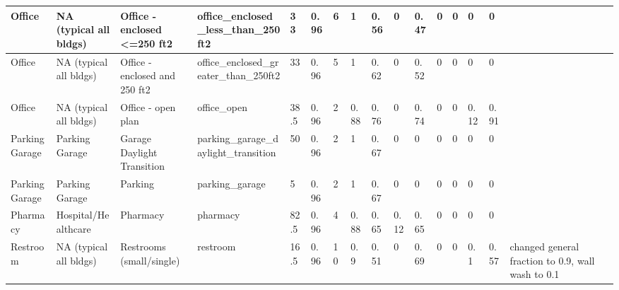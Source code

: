 \begin{center}
\begin{landscape}
\begin{longtable}{|p{0.75in}|p{0.75in}|p{0.75in}|p{0.75in}|p{0.3in}|p{0.3in}|p{0.3in}|p{0.3in}|p{0.3in}|p{0.3in}|p{0.3in}|p{0.3in}|p{0.3in}|p{0.3in}|p{0.3in}|p{0.6in}|}
      Office                                  & NA (typical all bldgs)      & Office - enclosed <=250 ft2                      & office\_enclosed\_less\_than\_250ft2                           & 33   & 0.96 & 6  & 1      & 0.56  & 0     & 0.47  & 0    & 0    & 0    & 0    &                                                                                      \\ \hline
      Office                                  & NA (typical all bldgs)      & Office - enclosed and 250 ft2                   & office\_enclosed\_greater\_than\_250ft2                         & 33   & 0.96 & 5  & 1      & 0.62  & 0     & 0.52  & 0    & 0    & 0    & 0    &                                                                                       \\ \hline
      Office                                  & NA (typical all bldgs)      & Office - open plan~                             & office\_open                                                    & 38.5 & 0.96 & 2  & 0.88   & 0.76  & 0     & 0.74  & 0    & 0    & 0.12 & 0.91 &                                                                                       \\ \hline
      Parking Garage                          & Parking Garage              & Garage Daylight Transition                      & parking\_garage\_daylight\_transition                           & 50   & 0.96 & 2  & 1      & 0.67  & 0     & 0     & 0    & 0    & 0    & 0    &                                                                                       \\ \hline
      Parking Garage                          & Parking Garage              & Parking                                         & parking\_garage                                                 & 5    & 0.96 & 2  & 1      & 0.67  & 0     & 0     & 0    & 0    & 0    & 0    &                                                                                       \\ \hline
      Pharmacy                                & Hospital/Healthcare         & Pharmacy                                        & pharmacy                                                        & 82.5 & 0.96 & 4  & 0.88   & 0.65  & 0.12  & 0.65  & 0    & 0    & 0    & 0    &                                                                                       \\ \hline
      Restroom                                & NA (typical all bldgs)      & Restrooms (small/single)                      & restroom                                                        & 16.5 & 0.96 & 10 & 0.9    & 0.51  & 0     & 0.69  & 0    & 0    & 0.1  & 0.57 & changed general fraction to 0.9, wall wash to 0.1                                     \\ \hline

\end{longtable}
\end{landscape}
\end{center}
